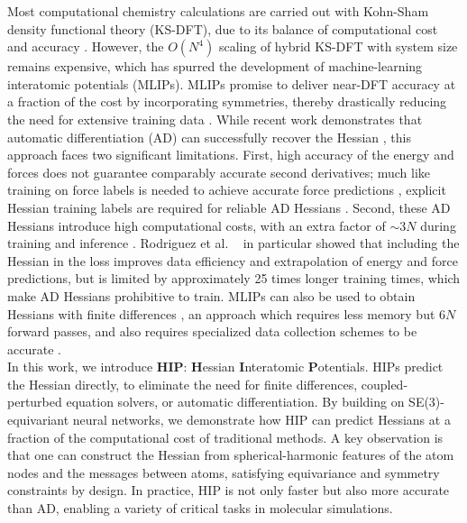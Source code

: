 \documentclass[pdflatex,sn-mathphys-num]{sn-jnl}%
\theoremstyle{thmstyleone}%
\theoremstyle{thmstyletwo}%
\theoremstyle{thmstylethree}%
\begin{document}
Most computational chemistry calculations are carried out with Kohn-Sham density functional theory \citep{kohn1965} (KS-DFT), due to its balance of computational cost and accuracy \citep{bursch2022}.
However, the $O(N^4)$ scaling of hybrid KS-DFT with system size remains expensive, which has spurred the development of machine-learning interatomic potentials (MLIPs). MLIPs promise to deliver near-DFT accuracy at a fraction of the cost by incorporating symmetries, thereby drastically reducing the need for extensive training data \citep{schutt2018,thomas2018,gasteiger2021,schutt2021,batatia2022,batzner2022}.
While recent work demonstrates that automatic differentiation (AD) can successfully recover the Hessian \citep{yang2024, yuan2024, gonnheimer2025, rodriguez2025, williams2025, cui2025horm}, this approach faces two significant limitations. First, high accuracy of the energy and forces does not guarantee comparably accurate second derivatives; much like training on force labels is needed to achieve accurate force predictions \cite{christensen2020forces}, explicit Hessian training labels are required for reliable AD Hessians \citep{zhao2025, cui2025horm}.
Second, these AD Hessians introduce high computational costs, with an extra factor of $\sim{}3N$ during training and inference \citep{yuan2024,gonnheimer2025,rodriguez2025,williams2025,cui2025horm}. 
Rodriguez et al. ~\cite{rodriguez2025} in particular showed that including the Hessian in the loss improves data efficiency and extrapolation of energy and force predictions, but is limited by approximately 25 times longer training times, which make AD Hessians prohibitive to train.
MLIPs can also be used to obtain Hessians with finite differences \citep{gonnheimer2025, fu2025}, an approach which requires less memory but $6N$ forward passes, and also requires specialized data collection schemes to be accurate \cite{wander2025accessing}.\\
In this work, we introduce \textbf{HIP}: \textbf{H}essian \textbf{I}nteratomic \textbf{P}otentials. HIPs predict the Hessian directly, to eliminate the need for finite differences, coupled-perturbed equation solvers, or automatic differentiation.
By building on SE(3)-equivariant neural networks, we demonstrate how HIP can predict Hessians at a fraction of the computational cost of traditional methods. 
A key observation is that one can construct the Hessian from spherical-harmonic features of the atom nodes and the messages between atoms, satisfying equivariance and symmetry constraints by design. 
In practice, HIP is not only faster but also more accurate than AD, enabling a variety of critical tasks in molecular simulations.\\
\end{document}
